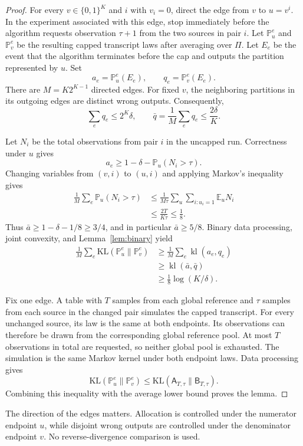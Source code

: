 \documentclass{article}
\newcommand{\E}{\mathbb E}
\newcommand{\Pp}{\mathbb P}
\newcommand{\KL}{\mathrm{KL}}
\newcommand{\cA}{\mathsf A}
\newcommand{\cB}{\mathsf B}
\begin{document}
\begin{proof}
For every $v\in\{0,1\}^K$ and $i$ with $v_i=0$, direct the edge from $v$ to $u=v^i$. In the experiment associated with this edge, stop immediately before the algorithm requests observation $\tau+1$ from the two sources in pair $i$. Let $\Pp_u^e$ and $\Pp_v^e$ be the resulting capped transcript laws after averaging over $\Pi$. Let $E_e$ be the event that the algorithm terminates before the cap and outputs the partition represented by $u$. Set
\[
a_e=\Pp_u^e(E_e),\qquad q_e=\Pp_v^e(E_e).
\]
There are $M=K2^{K-1}$ directed edges. For fixed $v$, the neighboring partitions in its outgoing edges are distinct wrong outputs. Consequently,
\[
\sum_e q_e\leq2^K\delta,\qquad \bar q=\frac1M\sum_e q_e\leq\frac{2\delta}{K}.
\]

Let $N_i$ be the total observations from pair $i$ in the uncapped run. Correctness under $u$ gives
\[
a_e\geq1-\delta-\Pp_u(N_i>\tau).
\]
Changing variables from $(v,i)$ to $(u,i)$ and applying Markov's inequality gives
\begin{align*}
\frac1M\sum_e\Pp_u(N_i>\tau)
&\leq\frac{1}{M\tau}\sum_u\sum_{i:u_i=1}\E_uN_i\\
&\leq\frac{2T}{K\tau}\leq\frac18.
\end{align*}
Thus $\bar a\geq1-\delta-1/8\geq3/4$, and in particular $\bar a\geq5/8$. Binary data processing, joint convexity, and Lemma~\ref{lem:binary} yield
\begin{align*}
\frac1M\sum_e\KL(\Pp_u^e\|\Pp_v^e)
&\geq\frac1M\sum_e\operatorname{kl}(a_e,q_e)\\
&\geq\operatorname{kl}(\bar a,\bar q)\\
&\geq\frac18\log(K/\delta).
\end{align*}

Fix one edge. A table with $T$ samples from each global reference and $\tau$ samples from each source in the changed pair simulates the capped transcript. For every unchanged source, its law is the same at both endpoints. Its observations can therefore be drawn from the corresponding global reference pool. At most $T$ observations in total are requested, so neither global pool is exhausted. The simulation is the same Markov kernel under both endpoint laws. Data processing gives
\[
\KL(\Pp_u^e\|\Pp_v^e)\leq\KL(\cA_{T,\tau}\|\cB_{T,\tau}).
\]
Combining this inequality with the average lower bound proves the lemma.
\end{proof}

The direction of the edges matters. Allocation is controlled under the numerator endpoint $u$, while disjoint wrong outputs are controlled under the denominator endpoint $v$. No reverse-divergence comparison is used.
\end{document}
